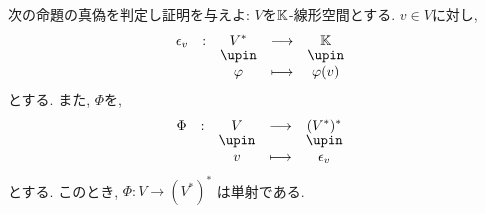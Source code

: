 \begin{quiz}
  次の命題の真偽を判定し証明を与えよ:
  $V$を$\mathbb{K}$-線形空間とする.
  $v\in V$に対し,
  \begin{align*}
    \shazo{\epsilon_v}{V^\ast}{\KK}
    {\varphi}{\varphi(v)}
  \end{align*}
  とする.
  また, $\Phi$を,
  \begin{align*}
    \shazo{\Phi}{V}{(V^\ast)^\ast}
    {v}{\epsilon_v}
  \end{align*}
  とする.
  このとき, 
  $\Phi\colon V\to (V^\ast)^\ast$
  は単射である.    
\end{quiz}

